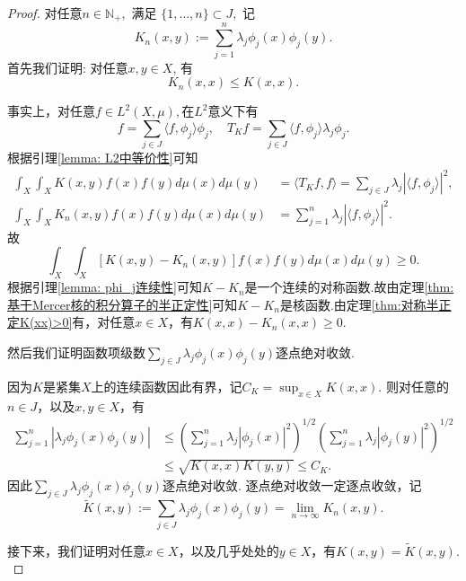 \documentclass[../master.tex]{subfiles}
\begin{document}
\begin{proof}
     对任意$n\in\mathbb N_+,$ 满足 $\{1,\dots,n\} \subset J,$ 记
$$K_{n}(x,y) := \sum_{j=1}^{n} \lambda_{j} \phi_{j}(x) \phi_{j}(y).$$
首先我们证明: 对任意$ x,y \in X$, 有
$$
K_{n}(x,x) \leq K(x,x).
$$

事实上，对任意$f\in L^2(X,\mu),$在$L^2$意义下有
\begin{equation*}
    f=\sum_{j\in J}\langle f,\phi_j\rangle\phi_j,\quad T_Kf=\sum_{j\in J}\langle f,\phi_j\rangle\lambda_j\phi_j.
\end{equation*}
根据引理\ref{lemma: L2中等价性}可知
\begin{align*}
    \int_{X}\int_{X}K(x,y)f(x)f(y)d\mu(x)d\mu(y) & =\langle T_{K}f,f\rangle=\sum_{j\in J}\lambda_{j}|\langle f,\phi_{j}\rangle|^{2}, \\
\int_{X}\int_{X}K_{n}(x,y)f(x)f(y)d\mu(x)d\mu(y) & =\sum_{j=1}^n\lambda_j|\langle f,\phi_j\rangle|^2.
\end{align*}
故
\begin{equation*}
    \int_X\int_X[K(x,y)-K_n(x,y)]f(x)f(y)d\mu(x)d\mu(y)\geq0.
\end{equation*}
根据引理\ref{lemma: phi_j连续性}可知$K-K_n$是一个连续的对称函数.故由定理\ref{thm:基于Mercer核的积分算子的半正定性}可知$K-K_n$是核函数.由定理\ref{thm:对称半正定K(xx)>0}有，对任意$x\in X$，有$K(x,x)-K_n(x,x)\geq 0$.


然后我们证明函数项级数$\sum_{j\in J} \lambda_j \phi_j(x)\phi_j(y)$逐点绝对收敛. 

因为$K$是紧集$X$上的连续函数因此有界，记$C_K = \sup_{x\in X} K(x,x)$. 则对任意的$n\in J$，以及$x,y\in X$，有
\begin{align}\label{eq:K_n的有界性}
    \sum_{j=1}^n |\lambda_j\phi_j(x)\phi_j(y)|&\leq \left(\sum_{j=1}^n\lambda_j|\phi_j(x)|^2\right)^{1/2}\left(\sum_{j=1}^n\lambda_j|\phi_j(y)|^2\right)^{1/2} \nonumber\\
    &\leq \sqrt{K(x,x)K(y,y)}\leq C_K .
\end{align}
因此$\sum_{j\in J} \lambda_j \phi_j(x)\phi_j(y)$逐点绝对收敛.
逐点绝对收敛一定逐点收敛，记
$$\widetilde{K}(x,y):=\sum_{j\in J}\lambda_j\phi_j(x)\phi_j(y)=\lim_{n\to\infty}K_n(x,y).$$

接下来，我们证明对任意$x\in X$，以及几乎处处的$y\in X$，有$K(x,y)= \widetilde{K}(x,y).$


\end{proof}
\end{document}
